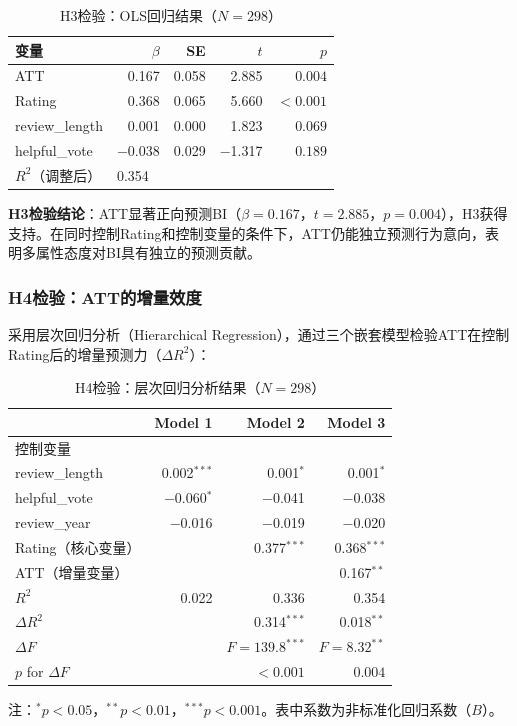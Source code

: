 \begin{table}[htbp]
\centering
\caption{H3检验：OLS回归结果（$N=298$）}
\label{tab:h3_ols}
\begin{threeparttable}
\begin{tabular}{@{}lrrrr@{}}
\toprule
变量 & $\beta$ & SE & $t$ & $p$ \\
\midrule
ATT & 0.167 & 0.058 & 2.885 & $0.004$ \\
Rating & 0.368 & 0.065 & 5.660 & $<0.001$ \\
review\_length & 0.001 & 0.000 & 1.823 & $0.069$ \\
helpful\_vote & $-$0.038 & 0.029 & $-$1.317 & $0.189$ \\
\midrule
$R^2$（调整后） & \multicolumn{4}{l}{0.354} \\
\bottomrule
\end{tabular}
\end{threeparttable}
\end{table}

\textbf{H3检验结论}：ATT显著正向预测BI（$\beta=0.167$，$t=2.885$，$p=0.004$），H3获得支持。在同时控制Rating和控制变量的条件下，ATT仍能独立预测行为意向，表明多属性态度对BI具有独立的预测贡献。

\subsubsection{H4检验：ATT的增量效度}

采用层次回归分析（Hierarchical Regression），通过三个嵌套模型检验ATT在控制Rating后的增量预测力（$\Delta R^2$）：

\begin{table}[htbp]
\centering
\caption{H4检验：层次回归分析结果（$N=298$）}
\label{tab:h4_hierarchical}
\begin{threeparttable}
\begin{tabular}{@{}lrrr@{}}
\toprule
 & Model 1 & Model 2 & Model 3 \\
\midrule
控制变量 & & & \\
\quad review\_length & 0.002$^{***}$ & 0.001$^{*}$ & 0.001$^{*}$ \\
\quad helpful\_vote & $-$0.060$^{*}$ & $-$0.041 & $-$0.038 \\
\quad review\_year & $-$0.016 & $-$0.019 & $-$0.020 \\
Rating（核心变量） & & 0.377$^{***}$ & 0.368$^{***}$ \\
ATT（增量变量） & & & 0.167$^{**}$ \\
\midrule
$R^2$ & 0.022 & 0.336 & 0.354 \\
$\Delta R^2$ & & 0.314$^{***}$ & 0.018$^{**}$ \\
$\Delta F$ & & $F=139.8^{***}$ & $F=8.32^{**}$ \\
$p$ for $\Delta F$ & & $<0.001$ & $0.004$ \\
\bottomrule
\end{tabular}
\begin{tablenotes}
\small
\item 注：$^{*}p<0.05$，$^{**}p<0.01$，$^{***}p<0.001$。表中系数为非标准化回归系数（$B$）。
\end{tablenotes}
\end{threeparttable}
\end{table}


